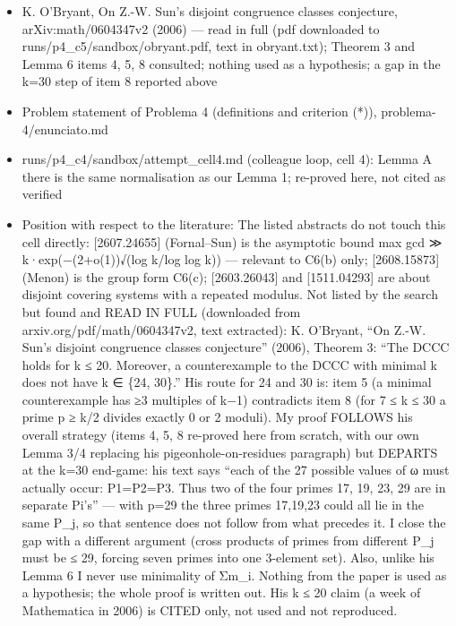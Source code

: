 \documentclass[11pt,a4paper]{article}
\providecommand{\tightlist}{\setlength{\itemsep}{0pt}\setlength{\parskip}{0pt}}
\begin{document}
\begin{itemize}
\tightlist
\item
  K. O'Bryant, On Z.-W. Sun's disjoint congruence classes conjecture,
  arXiv:math/0604347v2 (2006) --- read in full (pdf downloaded to
  runs/p4\_c5/sandbox/obryant.pdf, text in obryant.txt); Theorem 3 and
  Lemma 6 items 4, 5, 8 consulted; nothing used as a hypothesis; a gap
  in the k=30 step of item 8 reported above
\item
  Problem statement of Problema 4 (definitions and criterion (*)),
  problema-4/enunciato.md
\item
  runs/p4\_c4/sandbox/attempt\_cell4.md (colleague loop, cell 4): Lemma
  A there is the same normalisation as our Lemma 1; re-proved here, not
  cited as verified
\item
  Position with respect to the literature: The listed abstracts do not
  touch this cell directly: {[}2607.24655{]} (Fornal--Sun) is the
  asymptotic bound max gcd ≫ k·exp(−(2+o(1))√(log k/log log k)) ---
  relevant to C6(b) only; {[}2608.15873{]} (Menon) is the group form
  C6(c); {[}2603.26043{]} and {[}1511.04293{]} are about disjoint
  covering systems with a repeated modulus. Not listed by the search but
  found and READ IN FULL (downloaded from arxiv.org/pdf/math/0604347v2,
  text extracted): K. O'Bryant, ``On Z.-W. Sun's disjoint congruence
  classes conjecture'' (2006), Theorem 3: ``The DCCC holds for k ≤ 20.
  Moreover, a counterexample to the DCCC with minimal k does not have k
  ∈ \{24, 30\}.'' His route for 24 and 30 is: item 5 (a minimal
  counterexample has ≥3 multiples of k−1) contradicts item 8 (for 7 ≤ k
  ≤ 30 a prime p ≥ k/2 divides exactly 0 or 2 moduli). My proof FOLLOWS
  his overall strategy (items 4, 5, 8 re-proved here from scratch, with
  our own Lemma 3/4 replacing his pigeonhole-on-residues paragraph) but
  DEPARTS at the k=30 end-game: his text says ``each of the 27 possible
  values of ω must actually occur:
  \textbar P1\textbar=\textbar P2\textbar=\textbar P3. Thus
  two of the four primes 17, 19, 23, 29 are in separate Pi's'' --- with
  p=29 the three primes 17,19,23 could all lie in the same P\_j, so that
  sentence does not follow from what precedes it. I close the gap with a
  different argument (cross products of primes from different P\_j must
  be ≤ 29, forcing seven primes into one 3-element set). Also, unlike
  his Lemma 6 I never use minimality of Σm\_i. Nothing from the paper is
  used as a hypothesis; the whole proof is written out. His k ≤ 20 claim
  (a week of Mathematica in 2006) is CITED only, not used and not
  reproduced.
\end{itemize}
\end{document}
